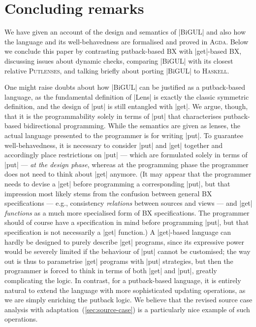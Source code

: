 \documentclass[fleqn]{llncs}
\renewcommand{\emph}{\textsl}
\newcommand{\Putlenses}{\textsc{Putlenses}}
\newcommand{\Agda}{\textsc{Agda}}
\newcommand{\Haskell}{\textsc{Haskell}}
\begin{document}
\section{Concluding remarks}
\label{sec:concluding-remarks}

We have given an account of the design and semantics of |BiGUL| and also how the language and its well-behavedness are formalised and proved in \Agda.
Below we conclude this paper by contrasting putback-based BX with |get|-based BX, discussing issues about dynamic checks, comparing |BiGUL| with its closest relative \Putlenses, and talking briefly about porting |BiGUL| to \Haskell.

One might raise doubts about how |BiGUL| can be justified as a putback-based language, as the fundamental definition of |Lens| is exactly the classic symmetric definition, and the design of |put| is still entangled with |get|.
We argue, though, that it is the programmability solely in terms of |put| that characterises putback-based bidirectional programming.
While the semantics are given as lenses, the actual language presented to the programmer is for writing |put|.
To guarantee well-behavedness, it is necessary to consider |put| and |get| together and accordingly place restrictions on |put| --- which are formulated solely in terms of |put| --- \emph{at the design phase}, whereas at the programming phase the programmer does not need to think about |get| anymore.
(It may appear that the programmer needs to devise a |get| before programming a corresponding |put|, but that impression most likely stems from the confusion between general BX specifications --- e.g., consistency \emph{relations} between sources and views --- and |get| \emph{functions} as a much more specialised form of BX specifications.
The programmer should of course have a specification in mind before programming |put|, but that specification is not necessarily a |get| function.)
A |get|-based language can hardly be designed to purely describe |get| programs, since its expressive power would be severely limited if the behaviour of |put| cannot be customised; the way out is thus to parametrise |get| programs with |put| strategies, but then the programmer is forced to think in terms of both |get| and |put|, greatly complicating the logic.
In contrast, for a putback-based language, it is entirely natural to extend the language with more sophisticated updating operations, as we are simply enriching the putback logic.
We believe that the revised source case analysis with adaptation~(\autoref{sec:source-case}) is a particularly nice example of such operations.
\end{document}
